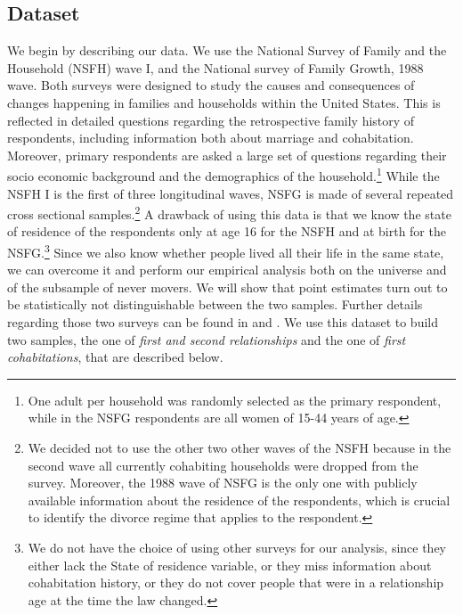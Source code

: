 \documentclass[12pt]{article}
\numberwithin{table}{section}
\begin{document}
\subsection{Dataset}\label{dataset}
We begin by describing our data. We use the National Survey of Family and the Household (NSFH) wave I, and the National survey of Family Growth, 1988 wave. Both surveys were designed to study the causes and consequences of changes happening in families and households within the United States. This is reflected in detailed questions regarding the retrospective family history of respondents, including information both about marriage and cohabitation. Moreover, primary respondents are asked a large set of questions regarding their socio economic background and the demographics of the household.\footnote{One adult per household was randomly selected as the primary respondent, while in the NSFG respondents are all women of 15-44 years of age.} While the NSFH I is the first of three longitudinal waves, NSFG is made of several repeated cross sectional samples.\footnote{We decided not to use the other two other waves of the NSFH because in the second wave all currently cohabiting households were dropped from the survey. Moreover, the 1988 wave of NSFG is the only one with publicly available information about the residence of the respondents, which is crucial to identify the divorce regime that applies to the respondent.} A drawback of using this data is that we know the state of residence of the respondents only at age 16 for the NSFH and at birth for the NSFG.\footnote{We do not have the choice of using other surveys for our analysis, since they either lack the State of residence variable, or they miss information about cohabitation history, or they do not cover people that were in a relationship age at the time the law changed.} Since we also know whether people lived all their life in the same state, we can overcome it and perform our empirical analysis both on the universe and of the subsample of never movers. We will show that point estimates turn out to be statistically not distinguishable between the two samples. Further details regarding those two surveys can be found in \cite{bumpass2017} and \cite{mosher1996}. We use this dataset to build two samples, the one of \textit{first and second relationships} and the one of \textit{first cohabitations}, that are described below.
  
\end{document}
